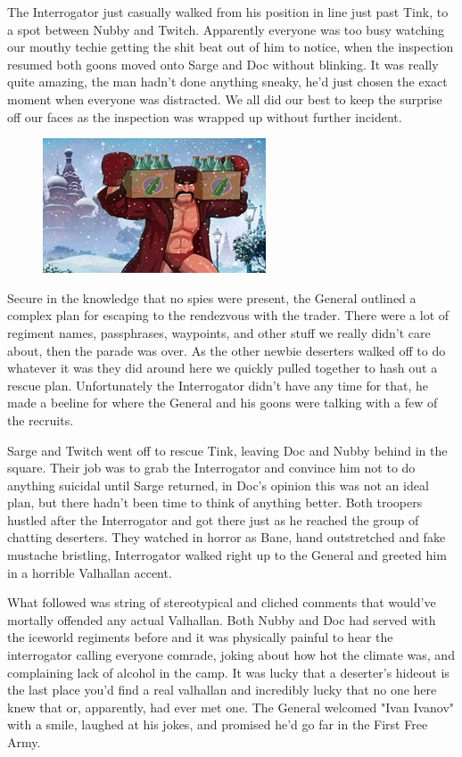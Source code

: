 The Interrogator just casually walked from his position in line just past Tink, to a spot between Nubby and Twitch. 
Apparently everyone was too busy watching our mouthy techie getting the shit beat out of him to notice, when the inspection resumed both goons moved onto Sarge and Doc without blinking. 
It was really quite amazing, the man hadn't done anything sneaky, he'd just chosen the exact moment when everyone was distracted. 
We all did our best to keep the surprise off our faces as the inspection was wrapped up without further incident.

\begin{figure}
	\begin{center}
		\includegraphics[width=\figwidth]{pics/9/29.png}
	\end{center}
\end{figure}
Secure in the knowledge that no spies were present, the General outlined a complex plan for escaping to the rendezvous with the trader. 
There were a lot of regiment names, passphrases, waypoints, and other stuff we really didn't care about, then the parade was over. 
As the other newbie deserters walked off to do whatever it was they did around here we quickly pulled together to hash out a rescue plan. 
Unfortunately the Interrogator didn't have any time for that, he made a beeline for where the General and his goons were talking with a few of the recruits.

Sarge and Twitch went off to rescue Tink, leaving Doc and Nubby behind in the square. 
Their job was to grab the Interrogator and convince him not to do anything suicidal until Sarge returned, in Doc's opinion this was not an ideal plan, but there hadn't been time to think of anything better. 
Both troopers hustled after the Interrogator and got there just as he reached the group of chatting deserters. 
They watched in horror as Bane, hand outstretched and fake mustache bristling, Interrogator walked right up to the General and greeted him in a horrible Valhallan accent.

What followed was string of stereotypical and cliched comments that would've mortally offended any actual Valhallan. 
Both Nubby and Doc had served with the iceworld regiments before and it was physically painful to hear the interrogator calling everyone comrade, joking about how hot the climate was, and complaining lack of alcohol in the camp. 
It was lucky that a deserter's hideout is the last place you'd find a real valhallan and incredibly lucky that no one here knew that or, apparently, had ever met one. 
The General welcomed "Ivan Ivanov" with a smile, laughed at his jokes, and promised he'd go far in the First Free Army. 


